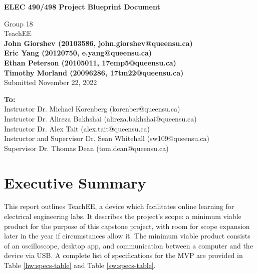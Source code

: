 \documentclass[letterpaper,12pt]{article}
\begin{document}
\begin{titlepage}
    \begin{center}
        \vspace*{1cm}

        \Large
        \textbf{ELEC 490/498 Project Blueprint Document}

        \vspace{0.5cm}
        Group 18\\
        TeachEE\\
        \vspace{0.5cm}
        \normalsize
        \textbf{John Giorshev (20103586, john.giorshev@queensu.ca) \\ Eric Yang (20120750, e.yang@queensu.ca) \\ Ethan Peterson (20105011, 17emp5@queensu.ca) \\ Timothy Morland (20096286, 17tm22@queensu.ca)}\\
        \vspace{0.5cm}
        Submitted November 22, 2022\\

        \vfill
            
        \textbf{To:}\\
        Instructor Dr. Michael Korenberg (korenber@queensu.ca) \\
        Instructor Dr. Alireza Bakhshai (alireza.bakhshai@queensu.ca) \\
        Instructor Dr. Alex Tait (alex.tait@queensu.ca) \\
        Instructor and Supervisor Dr. Sean Whitehall (sw109@queensu.ca) \\
        Supervisor Dr. Thomas Dean (tom.dean@queensu.ca) \\
            
        \vspace{1.8cm}

    \end{center}
\end{titlepage}
\section{Executive Summary}

This report outlines TeachEE, a device which facilitates online learning for
electrical engineering labs. It describes the project's scope: a minimum viable
product for the purpose of this capstone project, with room for scope expansion
later in the year if circumstances allow it. The minimum viable product consists
of an oscilloscope, desktop app, and communication between a computer and the
device via USB. A complete list of specifications for the MVP are provided in
Table \ref{hw:specs-table} and Table \ref{sw:specs-table}.
\end{document}
